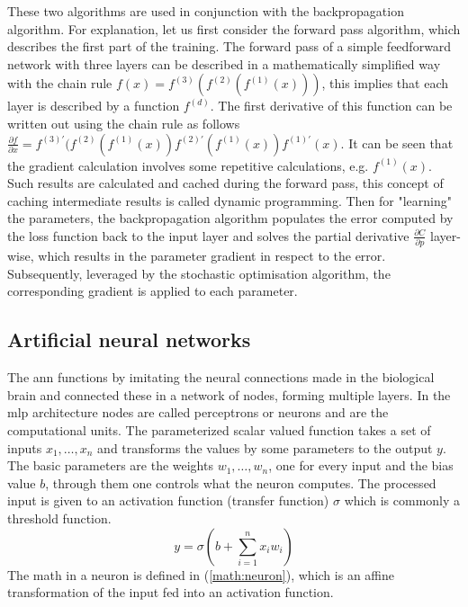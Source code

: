 These two algorithms are used in conjunction with the backpropagation algorithm.
For explanation, let us first consider the forward pass algorithm, which describes the first part of the training.
The forward pass of a simple feedforward network with three layers can be described in a mathematically simplified way with the chain rule $f(x)=f^{(3)}(f^{(2)}(f^{(1)}(x)))$, this implies that each layer is described by a function $f^{(d)}$. The first derivative of this function can be written out using the chain rule as follows $\frac{\partial f}{\partial x}=f^{(3)'}(f^{(2)}(f^{(1)}(x))f^{(2)'}(f^{(1)}(x))f^{(1)'}(x)$. It can be seen that the gradient calculation involves some repetitive calculations, e.g. $f^{(1)}(x)$. Such results are calculated and cached during the forward pass, this concept of caching intermediate results is called dynamic programming.
Then for "learning" the parameters, the backpropagation algorithm populates the error computed by the loss function back to the input layer and solves the partial derivative $\frac{\partial C}{\partial p}$ layer-wise, which results in the parameter gradient in respect to the error. Subsequently, leveraged by the stochastic optimisation algorithm, the corresponding gradient is applied to each parameter.

\subsection{Artificial neural networks}\label{sec:ann}
The \gls{ann} functions by imitating the neural connections made in the biological brain and connected these in a network of nodes, forming multiple layers.
In the \gls{mlp} architecture nodes are called perceptrons or neurons and are the computational units. The parameterized scalar valued function takes a set of inputs $x_1,\hdots,x_n$ and transforms the values by some parameters to the output $y$. The basic parameters are the weights $w_1,\hdots,w_n$, one for every input and the bias value $b$, through them one controls what the neuron computes. The processed input is given to an activation function (transfer function) $\sigma$ which is commonly a threshold function.
\begin{equation}
    y=\sigma\left(b + \sum\limits_{i=1}^{n}{x_iw_i}\right) \label{math:neuron}
\end{equation}
The math in a neuron is defined in (\ref{math:neuron}), which is an affine transformation of the input fed into an activation function.

